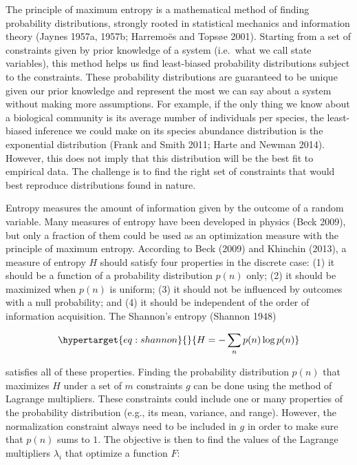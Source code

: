 \documentclass[11pt]{article}
\begin{document}
The principle of maximum entropy is a mathematical method of finding
probability distributions, strongly rooted in statistical mechanics and
information theory (Jaynes 1957a, 1957b; Harremoës and Topsøe 2001).
Starting from a set of constraints given by prior knowledge of a system
(i.e.~what we call state variables), this method helps us find
least-biased probability distributions subject to the constraints. These
probability distributions are guaranteed to be unique given our prior
knowledge and represent the most we can say about a system without
making more assumptions. For example, if the only thing we know about a
biological community is its average number of individuals per species,
the least-biased inference we could make on its species abundance
distribution is the exponential distribution (Frank and Smith 2011;
Harte and Newman 2014). However, this does not imply that this
distribution will be the best fit to empirical data. The challenge is to
find the right set of constraints that would best reproduce
distributions found in nature.

Entropy measures the amount of information given by the outcome of a
random variable. Many measures of entropy have been developed in physics
(Beck 2009), but only a fraction of them could be used as an
optimization measure with the principle of maximum entropy. According to
Beck (2009) and Khinchin (2013), a measure of entropy \(H\) should
satisfy four properties in the discrete case: (1) it should be a
function of a probability distribution \(p(n)\) only; (2) it should be
maximized when \(p(n)\) is uniform; (3) it should not be influenced by
outcomes with a null probability; and (4) it should be independent of
the order of information acquisition. The Shannon's entropy (Shannon
1948)

\begin{equation}\protect\hypertarget{eq:shannon}{}{H = -\sum_{n} p(n) \log p(n)}\label{eq:shannon}\end{equation}

satisfies all of these properties. Finding the probability distribution
\(p(n)\) that maximizes \(H\) under a set of \(m\) constraints \(g\) can
be done using the method of Lagrange multipliers. These constraints
could include one or many properties of the probability distribution
(e.g., its mean, variance, and range). However, the normalization
constraint always need to be included in \(g\) in order to make sure
that \(p(n)\) sums to \(1\). The objective is then to find the values of
the Lagrange multipliers \(\lambda_i\) that optimize a function \(F\):
\end{document}
